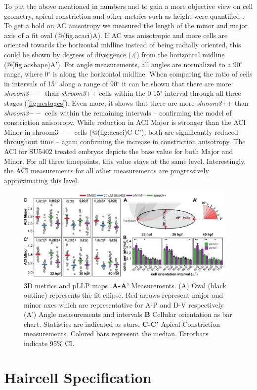 \documentclass[11pt,singlespacinge,twoside]{reedthesis} %
\begin{document}
To put the above mentioned in numbers and to gain a more objective view on cell geometry, apical constriction and other metrics such as height were quantified . To get a hold on AC anisotropy we measured the length of the minor and major axis of a fit oval (@(fig.acaci)A). If AC was anisotropic and more cells are oriented towards the horizontal midline instead of being radially oriented, this could be shown by degrees of divergence (\(\measuredangle\)) from the horizontal midline (@(fig.acshape)A').
For angle measurements, all angles are normalized to a 90\(^\circ\) range, where 0\(^\circ\) is along the horizontal midline. When comparing the ratio of cells in intervals of 15\(^\circ\) along a range of 90\(^\circ\) it can be shown that there are more \emph{shroom3}\(--\) than \emph{shroom3}++ cells within the 0-15\(^\circ\) interval through all three stages (\ref{fig:acstages}). Even more, it shows that there are more \emph{shroom3}++ than \emph{shroom3}\(--\) cells within the remaining intervals -- confirming the model of constriction anisotropy.
While reduction in ACI Major is stronger than the ACI Minor in shroom3\(--\) cells (@(fig:acaci)C-C'), both are significantly reduced throughout time -- again confirming the increase in constriction anisotropy. The ACI for SU5402 treated embryos depicts the base value for both Major and Minor. For all three timepoints, this value stays at the same level. Interestingly, the ACI measurements for all other measurements are progressively approximating this level.


\begin{figure}

{\centering \includegraphics[width=0.95\textwidth]{figures/results/04_constriction/Figure_5-2} 

}

\caption[Apical Constriction in 3D]{3D metrics and pLLP maps. \textbf{A-A'} Measurements. (A) Oval (black outline) represents the fit ellipse. Red arrows represent major and minor axes which are representative for A-P and D-V respectively (A') Angle measurements and intervals \textbf{B} Cellular orientation as bar chart. Statistics are indicated as stars. \textbf{C-C'} Apical Constriction measurements. Colored bars represent the median. Errorbars indicate 95\% CI.}\label{fig:acaci}
\end{figure}
\hypertarget{res-hc}{%
\section{Haircell Specification}\label{res-hc}}
\end{document}
